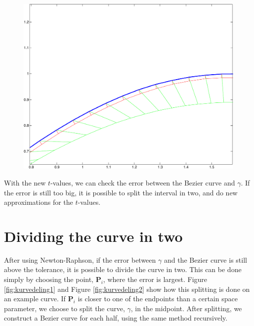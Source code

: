 \documentclass[10pt]{article}
\begin{document}
\begin{figure}
\centering
\begin{minipage}[t]{.4\textwidth}
\centering
\vspace{0pt}
    \includegraphics[scale=0.42, clip=true, trim = 0 0 0 5.5cm]{newtons3-crop.pdf}
    \label{fig:Newton-Raphson}
\end{minipage}\hfill
\begin{minipage}[t]{.4\textwidth}
\centering
\vspace{0pt}
\end{minipage}
\end{figure}


With the new $t$-values, we can check the error between the Bezier curve and $\gamma$. If the error is still too big, it is possible to split the interval in two, and do new approximations for the $t$-values.

\section*{Dividing the curve in two}
After using Newton-Raphson, if the error between $\gamma$ and the Bezier curve is still above the tolerance, it is possible to divide the curve in two. This can be done simply by choosing the point, $\mathbf{P}_i$, where the error is largest. Figure \ref{fig:kurvedeling1} and Figure \ref{fig:kurvedeling2} show how this splitting is done on an example curve. If $\mathbf{P}_i$ is closer to one of the endpoints than a certain space parameter, we choose to split the curve, $\gamma$, in the midpoint. After splitting, we construct a Bezier curve for each half, using the same method recursively.
\end{document}
